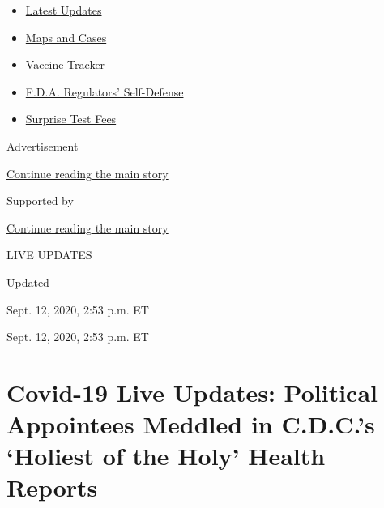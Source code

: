 \begin{itemize}
\tightlist
\item
  \href{https://www.nytimes3xbfgragh.onion/2020/09/12/world/covid-19-coronavirus.html?name=styln-coronavirus\&region=TOP_BANNER\&block=storyline_menu_recirc\&action=click\&pgtype=Article\&impression_id=22547d30-f52c-11ea-a21f-29f6111ec990\&variant=undefined}{Latest
  Updates}
\item
  \href{https://www.nytimes3xbfgragh.onion/interactive/2020/us/coronavirus-us-cases.html?name=styln-coronavirus\&region=TOP_BANNER\&block=storyline_menu_recirc\&action=click\&pgtype=Article\&impression_id=2254a440-f52c-11ea-a21f-29f6111ec990\&variant=undefined}{Maps
  and Cases}
\item
  \href{https://www.nytimes3xbfgragh.onion/interactive/2020/science/coronavirus-vaccine-tracker.html?name=styln-coronavirus\&region=TOP_BANNER\&block=storyline_menu_recirc\&action=click\&pgtype=Article\&impression_id=2254cb50-f52c-11ea-a21f-29f6111ec990\&variant=undefined}{Vaccine
  Tracker}
\item
  \href{https://www.nytimes3xbfgragh.onion/2020/09/10/us/politics/fda-coronavirus-vaccine.html?name=styln-coronavirus\&region=TOP_BANNER\&block=storyline_menu_recirc\&action=click\&pgtype=Article\&impression_id=2254cb51-f52c-11ea-a21f-29f6111ec990\&variant=undefined}{F.D.A.
  Regulators' Self-Defense}
\item
  \href{https://www.nytimes3xbfgragh.onion/2020/09/09/upshot/coronavirus-surprise-test-fees.html?name=styln-coronavirus\&region=TOP_BANNER\&block=storyline_menu_recirc\&action=click\&pgtype=Article\&impression_id=2254cb52-f52c-11ea-a21f-29f6111ec990\&variant=undefined}{Surprise
  Test Fees}
\end{itemize}

Advertisement

\protect\hyperlink{after-top}{Continue reading the main story}

Supported by

\protect\hyperlink{after-sponsor}{Continue reading the main story}

LIVE UPDATES

Updated~

Sept. 12, 2020, 2:53 p.m. ET

Sept. 12, 2020, 2:53 p.m. ET

\hypertarget{covid-19-live-updates-political-appointees-meddled-in-cdcs-holiest-of-the-holy-health-reports}{%
\section{Covid-19 Live Updates: Political Appointees Meddled in C.D.C.'s
`Holiest of the Holy' Health
Reports}\label{covid-19-live-updates-political-appointees-meddled-in-cdcs-holiest-of-the-holy-health-reports}}

